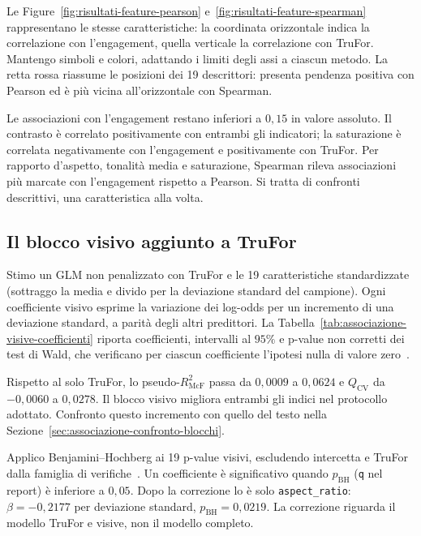 Le Figure~\ref{fig:risultati-feature-pearson} e~\ref{fig:risultati-feature-spearman} rappresentano le stesse caratteristiche: la coordinata orizzontale indica la correlazione con l'engagement, quella verticale la correlazione con TruFor. Mantengo simboli e colori, adattando i limiti degli assi a ciascun metodo. La retta rossa riassume le posizioni dei 19 descrittori: presenta pendenza positiva con Pearson ed è più vicina all'orizzontale con Spearman.

Le associazioni con l'engagement restano inferiori a $0{,}15$ in valore assoluto. Il contrasto è correlato positivamente con entrambi gli indicatori; la saturazione è correlata negativamente con l'engagement e positivamente con TruFor. Per rapporto d'aspetto, tonalità media e saturazione, Spearman rileva associazioni più marcate con l'engagement rispetto a Pearson. Si tratta di confronti descrittivi, una caratteristica alla volta.

\subsection{Il blocco visivo aggiunto a TruFor}
\label{subsec:associazione-visive-glm}

Stimo un GLM non penalizzato con TruFor e le 19 caratteristiche standardizzate (sottraggo la media e divido per la deviazione standard del campione). Ogni coefficiente visivo esprime la variazione dei log-odds per un incremento di una deviazione standard, a parità degli altri predittori. La Tabella~\ref{tab:associazione-visive-coefficienti} riporta coefficienti, intervalli al $95\%$ e p-value non corretti dei test di Wald, che verificano per ciascun coefficiente l'ipotesi nulla di valore zero~\cite{60455556-c6b2-37bb-9077-b6ce7e1443d8}.

Rispetto al solo TruFor, lo pseudo-$R^2_{\mathrm{McF}}$ passa da $0{,}0009$ a $0{,}0624$ e $Q_{\mathrm{CV}}$ da $-0{,}0060$ a $0{,}0278$. Il blocco visivo migliora entrambi gli indici nel protocollo adottato. Confronto questo incremento con quello del testo nella Sezione~\ref{sec:associazione-confronto-blocchi}.

Applico Benjamini--Hochberg ai 19 p-value visivi, escludendo intercetta e TruFor dalla famiglia di verifiche~\cite{10.1111/j.2517-6161.1995.tb02031.x}. Un coefficiente è significativo quando $p_{\mathrm{BH}}$ (\texttt{q} nel report) è inferiore a $0{,}05$. Dopo la correzione lo è solo \texttt{aspect\_ratio}: $\beta=-0{,}2177$ per deviazione standard, $p_{\mathrm{BH}}=0{,}0219$. La correzione riguarda il modello TruFor e visive, non il modello completo.

